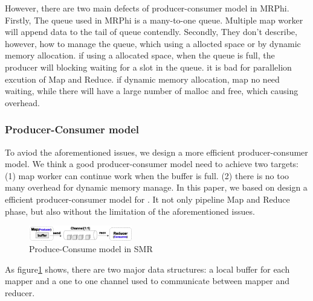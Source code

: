 However, there are two main defects of producer-consumer model in MRPhi.
Firstly, The queue used in MRPhi is a many-to-one queue.
Multiple map worker will append data to the tail of queue {\color{gray}contendly}. 
Secondly, They don’t describe, however, how to manage the queue,
which using a allocted space or by dynamic memory allocation.
if using a allocated space, when the queue is full, 
the producer will blocking waiting for a slot in the queue.
it is bad for parallelion excution of Map and Reduce.
if dynamic memory allocation, 
map no need waiting, while there will have a large number of malloc and free,
which causing overhead.


\subsubsection{Producer-Consumer model}
To aviod the aforementioned issues, 
we design a more efficient producer-consumer model. 
We think a good producer-consumer model need to achieve two targets:
(1) map worker can continue work when the buffer is full.
(2) there is no too many overhead for dynamic memory manage.
In this paper, we based on \myth design a efficient producer-consumer model for \myds.
It not only pipeline Map and Reduce phase, but also without the limitation of the aforementioned issues. 

\begin{figure}[!h!t]  
	\centering
	\includegraphics[width=0.4\textwidth]{eps/dmr_channel.eps}
	\caption{Produce-Consume model in SMR}
	\label{fig:dmr:channel}
\end{figure}

As figure\ref{fig:dmr:channel} shows, there are two major data structures:
a local buffer for each mapper and a one to one
channel used to communicate between mapper and reducer.

